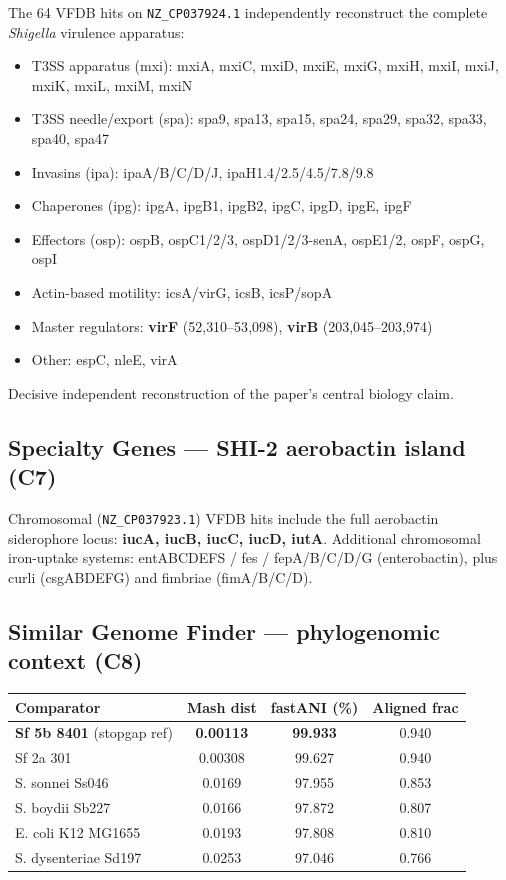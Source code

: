 \documentclass[11pt]{article}
\begin{document}
The 64 VFDB hits on \texttt{NZ\_CP037924.1} independently reconstruct the complete
\textit{Shigella} virulence apparatus:

\begin{itemize}[nosep]
  \item T3SS apparatus (mxi): mxiA, mxiC, mxiD, mxiE, mxiG, mxiH, mxiI, mxiJ, mxiK, mxiL, mxiM, mxiN
  \item T3SS needle/export (spa): spa9, spa13, spa15, spa24, spa29, spa32, spa33, spa40, spa47
  \item Invasins (ipa): ipaA/B/C/D/J, ipaH1.4/2.5/4.5/7.8/9.8
  \item Chaperones (ipg): ipgA, ipgB1, ipgB2, ipgC, ipgD, ipgE, ipgF
  \item Effectors (osp): ospB, ospC1/2/3, ospD1/2/3-senA, ospE1/2, ospF, ospG, ospI
  \item Actin-based motility: icsA/virG, icsB, icsP/sopA
  \item Master regulators: \textbf{virF} (52{,}310--53{,}098), \textbf{virB} (203{,}045--203{,}974)
  \item Other: espC, nleE, virA
\end{itemize}

Decisive independent reconstruction of the paper's central biology claim.

\subsection{Specialty Genes --- SHI-2 aerobactin island (C7)}

Chromosomal (\texttt{NZ\_CP037923.1}) VFDB hits include the full aerobactin siderophore locus:
\textbf{iucA, iucB, iucC, iucD, iutA}. Additional chromosomal iron-uptake systems: entABCDEFS /
fes / fepA/B/C/D/G (enterobactin), plus curli (csgABDEFG) and fimbriae (fimA/B/C/D).

\subsection{Similar Genome Finder --- phylogenomic context (C8)}

\begin{center}
\begin{tabular}{@{}lccc@{}}
\toprule
Comparator & Mash dist & fastANI (\%) & Aligned frac \\
\midrule
\textbf{Sf 5b 8401} (stopgap ref) & \textbf{0.00113} & \textbf{99.933} & 0.940 \\
Sf 2a 301 & 0.00308 & 99.627 & 0.940 \\
S. sonnei Ss046 & 0.0169 & 97.955 & 0.853 \\
S. boydii Sb227 & 0.0166 & 97.872 & 0.807 \\
E. coli K12 MG1655 & 0.0193 & 97.808 & 0.810 \\
S. dysenteriae Sd197 & 0.0253 & 97.046 & 0.766 \\
\bottomrule
\end{tabular}
\end{center}
\end{document}
